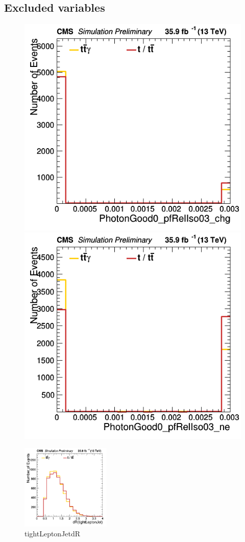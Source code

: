 \documentclass[11pt]{scrartcl}
\begin{document}
	\subsection{Excluded variables}
	\label{sec:annex-excluded}
	\begin{figure}[H]
	\centering
	\begin{minipage}{.5\textwidth}
	  \centering
	  \includegraphics[width=0.75\linewidth]{figures/Notused/PhotonGood0_pfRelIso03_chg.png}
	\end{minipage}%
	\begin{minipage}{.5\textwidth}
	  \centering
	  \includegraphics[width=0.75\linewidth]{figures/Notused/PhotonGood0_pfRelIso03_ne.png}
	\end{minipage}
	\end{figure}
	
	\begin{figure}[H]
		\begin{center}
		\includegraphics[width=0.38\textwidth]{figures/Notused/tightLeptonJetdR.png}
		\caption{tightLeptonJetdR}
		\end{center}
	\end{figure}
	
\end{document}
